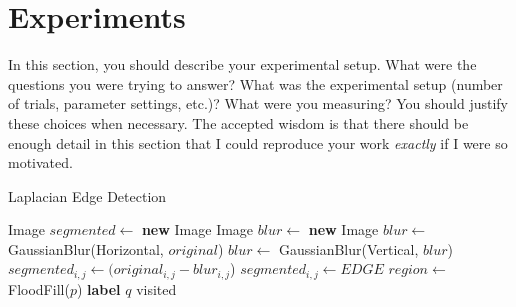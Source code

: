 
\section{Experiments}
\label{sec:expts}

In this section, you should describe your experimental setup. What
were the questions you were trying to answer? What was the
experimental setup (number of trials, parameter settings, etc.)? What
were you measuring? You should justify these choices when
necessary. The accepted wisdom is that there should be enough detail
in this section that I could reproduce your work \emph{exactly} if I
were so motivated.
\begin{algorithm}
\caption{Laplacian Edge Detection}\label{laplacian}
\begin{algorithmic}[1]
\State Image $segmented \gets$ \textbf{new} Image
\State Image  $blur \gets$ \textbf{new} Image
\State $blur \gets $ GaussianBlur(Horizontal, $original$)
\State $blur \gets $ GaussianBlur(Vertical, $blur$)
\State $segmented_{i, j} \gets (original_{i, j}-blur_{i, j}$)
\State $segmented_{i,j} \gets EDGE$
\EndIf
\EndFor
\State
{}
\State $region \gets$ FloodFill($p$) 
\State \textbf{label} $q$ visited
\EndFor
\EndIf
\EndFor
\end{algorithmic}
\end{algorithm}

